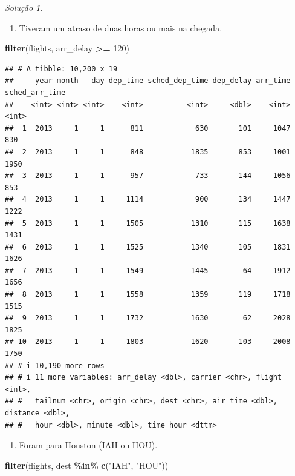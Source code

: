 \documentclass[
]{latex/krantz}
\newenvironment{Shaded}{\begin{snugshade}}{\end{snugshade}}
\newcommand{\DecValTok}[1]{\textcolor[rgb]{0.00,0.00,0.81}{#1}}
\newcommand{\FunctionTok}[1]{\textcolor[rgb]{0.13,0.29,0.53}{\textbf{#1}}}
\newcommand{\NormalTok}[1]{#1}
\newcommand{\SpecialCharTok}[1]{\textcolor[rgb]{0.81,0.36,0.00}{\textbf{#1}}}
\newcommand{\StringTok}[1]{\textcolor[rgb]{0.31,0.60,0.02}{#1}}
\providecommand{\tightlist}{%
  \setlength{\itemsep}{0pt}\setlength{\parskip}{0pt}}
\theoremstyle{definition}
\theoremstyle{definition}
\theoremstyle{definition}
\theoremstyle{definition}
\theoremstyle{remark}
\newtheorem*{solution}{Solução}
\begin{document}
\begin{solution}
\leavevmode

\begin{enumerate}
\def\labelenumi{\alph{enumi}.}
\tightlist
\item
  Tiveram um atraso de duas horas ou mais na chegada.
\end{enumerate}

\begin{Shaded}
\begin{Highlighting}[]
\FunctionTok{filter}\NormalTok{(flights, arr\_delay }\SpecialCharTok{\textgreater{}=} \DecValTok{120}\NormalTok{)}
\end{Highlighting}
\end{Shaded}

\begin{verbatim}
## # A tibble: 10,200 x 19
##     year month   day dep_time sched_dep_time dep_delay arr_time sched_arr_time
##    <int> <int> <int>    <int>          <int>     <dbl>    <int>          <int>
##  1  2013     1     1      811            630       101     1047            830
##  2  2013     1     1      848           1835       853     1001           1950
##  3  2013     1     1      957            733       144     1056            853
##  4  2013     1     1     1114            900       134     1447           1222
##  5  2013     1     1     1505           1310       115     1638           1431
##  6  2013     1     1     1525           1340       105     1831           1626
##  7  2013     1     1     1549           1445        64     1912           1656
##  8  2013     1     1     1558           1359       119     1718           1515
##  9  2013     1     1     1732           1630        62     2028           1825
## 10  2013     1     1     1803           1620       103     2008           1750
## # i 10,190 more rows
## # i 11 more variables: arr_delay <dbl>, carrier <chr>, flight <int>,
## #   tailnum <chr>, origin <chr>, dest <chr>, air_time <dbl>, distance <dbl>,
## #   hour <dbl>, minute <dbl>, time_hour <dttm>
\end{verbatim}

\begin{enumerate}
\def\labelenumi{\alph{enumi}.}
\setcounter{enumi}{1}
\tightlist
\item
  Foram para Houston (IAH ou HOU).
\end{enumerate}

\begin{Shaded}
\begin{Highlighting}[]
\FunctionTok{filter}\NormalTok{(flights, dest }\SpecialCharTok{\%in\%} \FunctionTok{c}\NormalTok{(}\StringTok{"IAH"}\NormalTok{, }\StringTok{"HOU"}\NormalTok{))}
\end{Highlighting}
\end{Shaded}


\end{solution}
\end{document}
